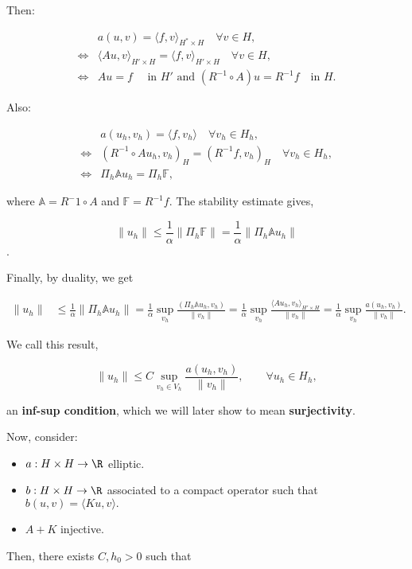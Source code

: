 Then:

\begin{align*}
    &a(u,v) = \langle f, v\rangle_{H^*\times H}\quad \forall v\in H,\\
    \iff &\langle Au, v\rangle_{H'\times H} = \langle f, v\rangle_{H'\times H}\quad \forall v\in H,\\
    \iff &Au = f \quad\text{ in $H'$ and }(R^{-1}\circ A)u = R^{-1}f\quad\text{in }H.
\end{align*}

Also:

\begin{align*}
    &a(u_h,v_h) = \langle f, v_h\rangle\quad\forall v_h\in H_h,\\
    \iff &(R^{-1}\circ A u_h,v_h)_H = (R^{-1}f,v_h)_H\quad\forall v_h\in H_h,\\
    \iff &\Pi_h\mathbb{A}u_h = \Pi_h\mathbb{F},
\end{align*}

where $\mathbb{A} = R^-1\circ A$ and $\mathbb{F} = R^{-1}f$. The stability estimate gives, 

\[\|u_h\| \leq\frac{1}{\alpha}\|\Pi_h\mathbb{F}\| = \frac{1}{\alpha}\|\Pi_h\mathbb{A} u_h\|\].

Finally, by duality, we get

\begin{align*}
    \|u_h\| &\leq \frac{1}{\alpha}\|\Pi_h\mathbb{A}u_h\| = \frac{1}{\alpha}\sup_{v_h}\frac{(\Pi_h\mathbb{A}u_h,v_h)}{\|v_h\|}
    =\frac{1}{\alpha}\sup_{v_h}\frac{\langle Au_h,v_h\rangle_{H'\times H}}{\|v_h\|} = \frac{1}{\alpha}\sup_{v_h}\frac{a(u_h,v_h)}{\|v_h\|}.
\end{align*}

We call this result,

\[\|u_h\| \leq C\sup_{v_h\in V_h}\frac{a(u_h,v_h)}{\|v_h\|},\qquad \forall u_h\in H_h,\]

an \textbf{inf-sup condition}, which we will later show to mean \textbf{surjectivity}. 

Now, consider:
\begin{itemize}
    \item $a:H\times H\to \R$ elliptic. 
    \item $b:H\times H\to \R$ associated to a compact operator such that $b(u,v) = \langle Ku,v\rangle.$
    \item $A + K$ injective.
\end{itemize}

Then, there exists $C, h_0>0$ such that


